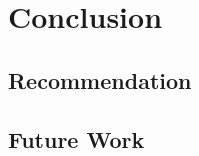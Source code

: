 \documentclass[ExampleMasters.tex]{subfiles}
\begin{document}
\chapter{Conclusion}


\section{Recommendation}

\section{Future Work}
\end{document}

